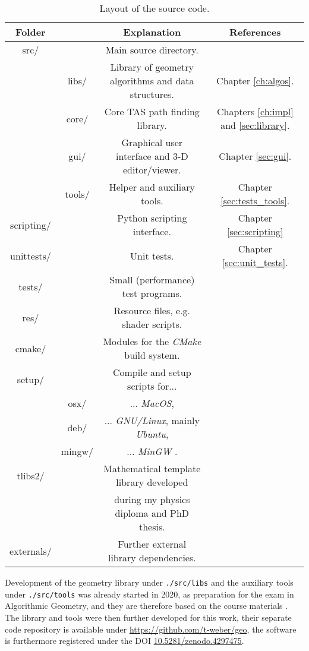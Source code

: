 \begin{table}[htb]
	\centering
	\begin{tabular}{|c c|c|c|}
		\hline
		\bf{Folder} & & \bf{Explanation} & \bf{References} \tabularnewline
		\hline
		src/ & & Main source directory. & \tabularnewline
		       & libs/ & Library of geometry algorithms and data structures. & Chapter \ref{ch:algos}. \tabularnewline
		       & core/ & Core TAS path finding library. & Chapters \ref{ch:impl} and \ref{sec:library}. \tabularnewline
		       & gui/ & Graphical user interface and 3-D editor/viewer. & Chapter \ref{sec:gui}. \tabularnewline
		       & tools/ & Helper and auxiliary tools. & Chapter \ref{sec:tests_tools}. \tabularnewline
		\hline
		scripting/ & & Python scripting interface. & Chapter \ref{sec:scripting} \tabularnewline
		\hline
		unittests/ & & Unit tests. & Chapter \ref{sec:unit_tests}. \tabularnewline
		\hline
		tests/ & & Small (performance) test programs. & \tabularnewline
		\hline
		res/ & & Resource files, e.g. shader scripts. & \tabularnewline
		\hline
		cmake/ & & Modules for the \textit{CMake} \cite{Martin2007, web_cmake} build system. & \tabularnewline
		\hline
		setup/ & & Compile and setup scripts for... & \tabularnewline
		           & osx/ & ... \textit{MacOS}, & \tabularnewline
		           & deb/ & ... \textit{GNU/Linux}, mainly \textit{Ubuntu}, & \tabularnewline
		           & mingw/ & ... \textit{MinGW} \cite{web_mingw64}. & \tabularnewline
		\hline
		tlibs2/ & & Mathematical template library developed  & \cite{Takin2016, Takin2017, Takin2021, DiplomaWeber, PhDWeber} \tabularnewline
		           & & during my physics diploma and PhD thesis. & \tabularnewline
		\hline
		externals/ & & Further external library dependencies. & \tabularnewline
		\hline
	\end{tabular}
	\caption[Source code layout.]{Layout of the source code.}
	\label{tab:sourcelayout}
\end{table}

Development of the geometry library under \lstinline|./src/libs| and the auxiliary tools under \lstinline|./src/tools| 
was already started in 2020, as preparation for the exam in Algorithmic Geometry, and they 
are therefore based on the course materials \cite{FUH_geo2020}. 
The library and tools were then further developed for this work, their separate code repository is available under 
\url{https://github.com/t-weber/geo}, the software is furthermore registered under the DOI 
\href{https://doi.org/10.5281/zenodo.4297475}{10.5281/zenodo.4297475}.

